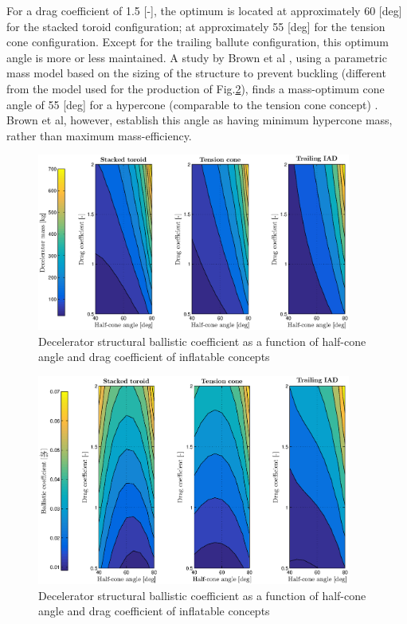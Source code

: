 For a drag coefficient of 1.5 [-], the optimum is located at approximately 60 [deg] for the stacked toroid configuration; at approximately 55 [deg] for the tension cone configuration. Except for the trailing ballute configuration, this optimum angle is more or less maintained. A study by Brown et al \cite{Brown2003}, using a parametric mass model based on the sizing of the structure to prevent buckling (different from the model used for the production of Fig.\ref{fig:bc_theta_cd}), finds a mass-optimum cone angle of 55 [deg] for a hypercone (comparable to the tension cone concept) \cite[p.6]{Brown2003}. Brown et al, however, establish this angle as having minimum hypercone mass, rather than maximum mass-efficiency. 
\begin{figure}[H]
\centering
\includegraphics[width = 0.92\textwidth]{Figure/mass_theta_cd.eps}
\caption{Decelerator structural ballistic coefficient as a function of half-cone angle and drag coefficient of inflatable concepts}
\label{fig:mass_theta_cd}
\end{figure}

\begin{figure}[H]
\centering
\includegraphics[width = 0.92\textwidth]{Figure/bc_theta_cd.eps}
\caption{Decelerator structural ballistic coefficient as a function of half-cone angle and drag coefficient of inflatable concepts}
\label{fig:bc_theta_cd}
\end{figure}